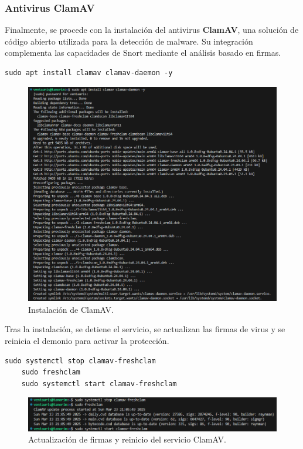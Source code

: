 \documentclass[11pt,a4paper,twoside]{report}
\begin{document}
\subsubsection*{Antivirus ClamAV}

Finalmente, se procede con la instalación del antivirus \textbf{ClamAV}, una solución de código abierto utilizada para la detección de malware. Su integración complementa las capacidades de Snort mediante el análisis basado en firmas.

\begin{lstlisting}[style=commandstyle, caption={Instalación del antivirus ClamAV}]
	sudo apt install clamav clamav-daemon -y
\end{lstlisting}

\begin{figure}[H]
	\centering
	\includegraphics[scale=0.6]{clamAV/1.png}
	\caption{Instalación de ClamAV.}
\end{figure}

Tras la instalación, se detiene el servicio, se actualizan las firmas de virus y se reinicia el demonio para activar la protección.

\begin{lstlisting}[style=commandstyle, caption={Actualización de firmas y reinicio del servicio ClamAV}]
	sudo systemctl stop clamav-freshclam
	sudo freshclam
	sudo systemctl start clamav-freshclam
\end{lstlisting}

\begin{figure}[H]
	\centering
	\includegraphics[scale=0.6]{clamAV/2.png}
	\caption{Actualización de firmas y reinicio del servicio ClamAV.}
\end{figure}
\end{document}
